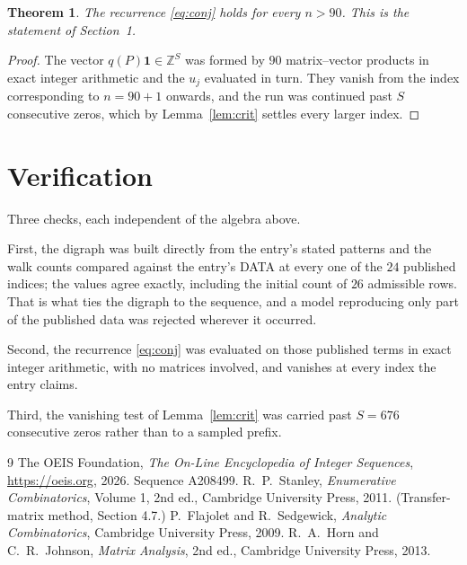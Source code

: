 \documentclass[11pt,a4paper]{article}
\theoremstyle{plain}
\newtheorem{theorem}{Theorem}
\theoremstyle{definition}
\begin{document}
\begin{theorem}
The recurrence \eqref{eq:conj} holds for every $n>90$. This is the statement of
Section~1.
\end{theorem}

\begin{proof}
The vector $q(P)\mathbf{1}\in\mathbb{Z}^{S}$ was formed by $90$ matrix--vector
products in exact integer arithmetic and the $u_j$ evaluated in turn. They vanish from the
index corresponding to $n=90+1$ onwards, and the run was continued past $S$ consecutive
zeros, which by Lemma~\ref{lem:crit} settles every larger index.
\end{proof}

\section{Verification}

Three checks, each independent of the algebra above.

First, the digraph was built directly from the entry's stated patterns and the walk counts
compared against the entry's DATA at every one of the $24$ published indices; the
values agree exactly, including the initial count of $26$ admissible rows. That is
what ties the digraph to the sequence, and a model reproducing only part of the published
data was rejected wherever it occurred.

Second, the recurrence \eqref{eq:conj} was evaluated on those published terms in exact
integer arithmetic, with no matrices involved, and vanishes at every index the entry claims.

Third, the vanishing test of Lemma~\ref{lem:crit} was carried past $S=676$ consecutive
zeros rather than to a sampled prefix.

\begin{thebibliography}{9}
 The OEIS Foundation, \emph{The On-Line Encyclopedia of Integer
Sequences}, \url{https://oeis.org}, 2026. Sequence A208499.
 R.~P.~Stanley, \emph{Enumerative Combinatorics}, Volume 1, 2nd ed.,
Cambridge University Press, 2011. (Transfer-matrix method, Section 4.7.)
 P.~Flajolet and R.~Sedgewick, \emph{Analytic Combinatorics}, Cambridge
University Press, 2009.
 R.~A.~Horn and C.~R.~Johnson, \emph{Matrix Analysis}, 2nd ed., Cambridge
University Press, 2013.
\end{thebibliography}
\end{document}
